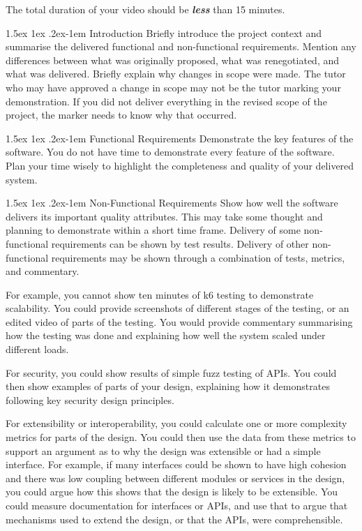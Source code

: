 \documentclass{csse4400}
\makeatletter
\renewcommand{\paragraph}{%
  \@startsection{paragraph}{4}%
  {\z@}{1.5ex \@plus 1ex \@minus .2ex}{-1em}%
  {\normalfont\normalsize\bfseries}%
}
\makeatother
\begin{document}
\noindent
The total duration of your video should be \textbf{\emph{less}} than 15 minutes.

\paragraph{Introduction} Briefly introduce the project context and summarise the delivered functional and non-functional requirements.
Mention any differences between what was originally proposed, what was renegotiated, and what was delivered.
Briefly explain why changes in scope were made.
The tutor who may have approved a change in scope may not be the tutor marking your demonstration.
If you did not deliver everything in the revised scope of the project, the marker needs to know why that occurred.

\paragraph{Functional Requirements} Demonstrate the key features of the software.
You do not have time to demonstrate every feature of the software.
Plan your time wisely to highlight the completeness and quality of your delivered system.

\paragraph{Non-Functional Requirements} Show how well the software delivers its important quality attributes.
This may take some thought and planning to demonstrate within a short time frame.
Delivery of some non-functional requirements can be shown by test results.
Delivery of other non-functional requirements may be shown through a combination of tests, metrics, and commentary.

For example, you cannot show ten minutes of k6 testing to demonstrate scalability.
You could provide screenshots of different stages of the testing, or an edited video of parts of the testing.
You would provide commentary summarising how the testing was done and explaining how well the system scaled under different loads.

For security, you could show results of simple fuzz testing of APIs.
You could then show examples of parts of your design, explaining how it demonstrates following key security design principles.

For extensibility or interoperability, you could calculate one or more complexity metrics for parts of the design.
You could then use the data from these metrics to support an argument as to why the design was extensible or had a simple interface.
For example, if many interfaces could be shown to have high cohesion and there was low coupling between different modules
or services in the design, you could argue how this shows that the design is likely to be extensible.
You could measure documentation for interfaces or APIs,
and use that to argue that mechanisms used to extend the design, or that the APIs, were comprehensible.
\end{document}
